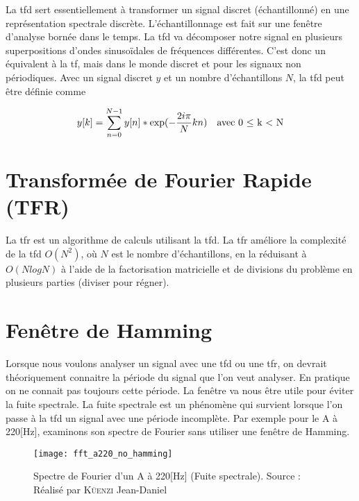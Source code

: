 La \gls{tfd} sert essentiellement à transformer un signal discret (échantillonné) en une représentation spectrale discrète. L’échantillonnage est fait sur une fenêtre d’analyse bornée dans le temps. La \gls{tfd} va décomposer notre signal en plusieurs superpositions d'ondes sinusoïdales de fréquences différentes. C’est donc un équivalent à la \gls{tf}, mais dans le monde discret et pour les signaux non périodiques. Avec un signal discret $y$ et un nombre d’échantillons $N$, la \gls{tfd} peut être définie comme

{\Large
	\setlength{\abovedisplayskip}{-0.5cm}
	\begin{align*}
			y[k] = \sum_{n=0}^{N-1}{y[n] * \text{exp}(-\frac{2i\pi}{N}kn)} \text{\hspace{10pt}avec 0 $\leq$ k < N}
	\end{align*}
}

\section{Transformée de Fourier Rapide (TFR)}
\label{sec:2.6}

La \gls{tfr} est un algorithme de calculs utilisant la \gls{tfd}. La \gls{tfr} améliore la complexité de la \gls{tfd} $O(N^{2})$, où $N$ est le nombre d’échantillons, en la réduisant à $O(N log N)$ à l’aide de la factorisation matricielle et de divisions du problème en plusieurs parties (diviser pour régner).

\section{Fenêtre de Hamming}
\label{sec:2.7}

Lorsque nous voulons analyser un signal avec une \gls{tfd} ou une \gls{tfr}, on devrait théoriquement connaitre la période du signal que l'on veut analyser. En pratique on ne connait pas toujours cette période. La fenêtre va nous être utile pour éviter la fuite spectrale. La fuite spectrale est un phénomène qui survient lorsque l'on passe à la \gls{tfd} un signal avec une période incomplète. Par exemple pour le A à 220[Hz], examinons son spectre de Fourier sans utiliser une fenêtre de Hamming.

\begin{figure}[H]
	\centering
	\texttt{[image: fft\_a220\_no\_hamming]}
	\caption[Spectre de Fourier d'un A à 220 Hertz (fuite spectrale)]{Spectre de Fourier d'un A à 220[Hz] (Fuite spectrale). Source : Réalisé par \textsc{Küenzi} Jean-Daniel}
	\label{fig:fft_a220_no_hamming}
\end{figure}

